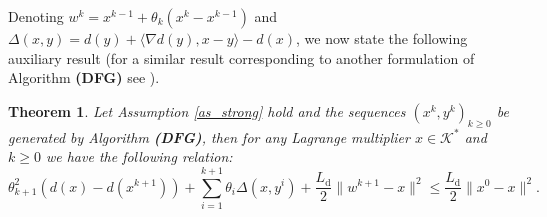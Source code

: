 \documentclass{gOMS2e}
\theoremstyle{plain}
\newtheorem{theorem}{Theorem}[section]
\theoremstyle{definition}
\theoremstyle{remark}
\providecommand{\norm}[1]{\lVert#1\rVert}
\begin{document}
\noindent Denoting $w^k = x^{k-1}+ \theta_k(x^k - x^{k-1})$  and
$\Delta(x,y) = d(y) + \langle \nabla d(y), x- y\rangle -d(x)$, we
now state the following auxiliary result (for a similar result
corresponding to another formulation of Algorithm {\bf (DFG)} see
\cite{Tse:08}).

\begin{theorem}
\label{corr2}  Let Assumption \ref{as_strong} hold and the sequences
$(x^k,y^k)_{k \ge 0}$ be generated by Algorithm {\bf (DFG)}, then
for any Lagrange multiplier $x \in \mathcal{K}^*$ and $k \geq 0$ we
have the following relation:
\begin{equation}\label{corr2_relation}
\theta_{k+1}^2 (d(x) - d(x^{k+1})) +
\sum\limits_{i=1}^{k+1}\theta_{i}\Delta(x,y^i) +
\frac{L_\text{d}}{2}\norm{w^{k+1}-x}^2 \le
\frac{L_\text{d}}{2}\norm{x^0-x}^2.
\end{equation}
\end{theorem}
\end{document}
